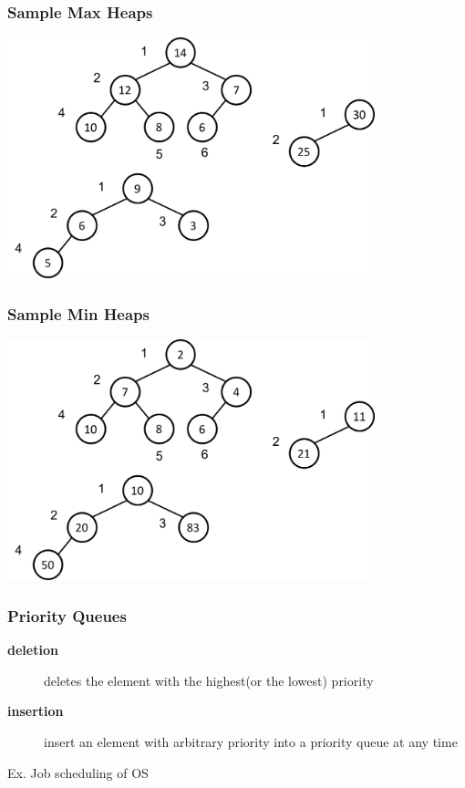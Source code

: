 \documentclass[newPxFont,sthlmFooter,nooffset]{beamer}
\begin{document}
\begin{frame}[t]
  \frametitle{Sample Max Heaps}
  \begin{center}
    \includegraphics[width=0.8\textwidth]{figures/fig12_sample_heap.png}
  \end{center}

\end{frame}


\begin{frame}[t]
  \frametitle{Sample Min Heaps}
  \begin{center}
    \includegraphics[width=0.8\textwidth]{figures/fig12_sample_heap1.png}
  \end{center}

\end{frame}

\begin{frame}[t]
  \frametitle{Priority Queues}
  \begin{description}
  \item [\textbf{deletion}] deletes the element with the highest(or
    the lowest) priority
  \item [\textbf{insertion}] insert an element with arbitrary priority
    into a priority queue at any time
  \end{description}
Ex. Job scheduling of OS
\end{frame}
\end{document}
